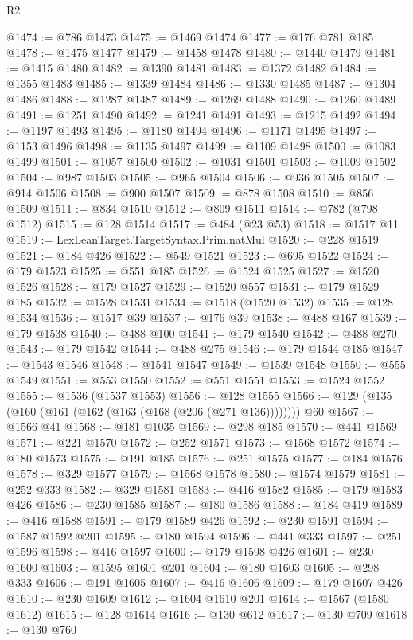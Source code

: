 \begin{lexlean}{R2}
\begin{coremodule}
@1474 := @786 @1473
@1475 := @1469 @1474
@1477 := @176 @781 @185
@1478 := @1475 @1477
@1479 := @1458 @1478
@1480 := @1440 @1479
@1481 := @1415 @1480
@1482 := @1390 @1481
@1483 := @1372 @1482
@1484 := @1355 @1483
@1485 := @1339 @1484
@1486 := @1330 @1485
@1487 := @1304 @1486
@1488 := @1287 @1487
@1489 := @1269 @1488
@1490 := @1260 @1489
@1491 := @1251 @1490
@1492 := @1241 @1491
@1493 := @1215 @1492
@1494 := @1197 @1493
@1495 := @1180 @1494
@1496 := @1171 @1495
@1497 := @1153 @1496
@1498 := @1135 @1497
@1499 := @1109 @1498
@1500 := @1083 @1499
@1501 := @1057 @1500
@1502 := @1031 @1501
@1503 := @1009 @1502
@1504 := @987 @1503
@1505 := @965 @1504
@1506 := @936 @1505
@1507 := @914 @1506
@1508 := @900 @1507
@1509 := @878 @1508
@1510 := @856 @1509
@1511 := @834 @1510
@1512 := @809 @1511
@1514 := @782 (@798 @1512)
@1515 := @128 @1514
@1517 := @484 (@23 @53)
@1518 := @1517 @11
@1519 := LexLeanTarget.TargetSyntax.Prim.natMul
@1520 := @228 @1519
@1521 := @184 @426
@1522 := @549 @1521
@1523 := @695 @1522
@1524 := @179 @1523
@1525 := @551 @185
@1526 := @1524 @1525
@1527 := @1520 @1526
@1528 := @179 @1527
@1529 := @1520 @557
@1531 := @179 @1529 @185
@1532 := @1528 @1531
@1534 := @1518 (@1520 @1532)
@1535 := @128 @1534
@1536 := @1517 @39
@1537 := @176 @39
@1538 := @488 @167
@1539 := @179 @1538
@1540 := @488 @100
@1541 := @179 @1540
@1542 := @488 @270
@1543 := @179 @1542
@1544 := @488 @275
@1546 := @179 @1544 @185
@1547 := @1543 @1546
@1548 := @1541 @1547
@1549 := @1539 @1548
@1550 := @555 @1549
@1551 := @553 @1550
@1552 := @551 @1551
@1553 := @1524 @1552
@1555 := @1536 (@1537 @1553)
@1556 := @128 @1555
@1566 := @129 (@135 (@160 (@161 (@162 (@163 (@168 (@206 (@271 @136)))))))) @60
@1567 := @1566 @41
@1568 := @181 @1035
@1569 := @298 @185
@1570 := @441 @1569
@1571 := @221 @1570
@1572 := @252 @1571
@1573 := @1568 @1572
@1574 := @180 @1573
@1575 := @191 @185
@1576 := @251 @1575
@1577 := @184 @1576
@1578 := @329 @1577
@1579 := @1568 @1578
@1580 := @1574 @1579
@1581 := @252 @333
@1582 := @329 @1581
@1583 := @416 @1582
@1585 := @179 @1583 @426
@1586 := @230 @1585
@1587 := @180 @1586
@1588 := @184 @419
@1589 := @416 @1588
@1591 := @179 @1589 @426
@1592 := @230 @1591
@1594 := @1587 @1592 @201
@1595 := @180 @1594
@1596 := @441 @333
@1597 := @251 @1596
@1598 := @416 @1597
@1600 := @179 @1598 @426
@1601 := @230 @1600
@1603 := @1595 @1601 @201
@1604 := @180 @1603
@1605 := @298 @333
@1606 := @191 @1605
@1607 := @416 @1606
@1609 := @179 @1607 @426
@1610 := @230 @1609
@1612 := @1604 @1610 @201
@1614 := @1567 (@1580 @1612)
@1615 := @128 @1614
@1616 := @130 @612
@1617 := @130 @709
@1618 := @130 @760

\end{coremodule}
\end{lexlean}
